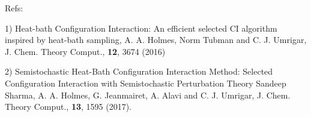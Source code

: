 \documentclass[12pt,aps,prb,groupedaddress,amsmath,amssymb]{revtex4-1}
\begin{document}
\vskip 9mm
Refs:
\small


1) Heat-bath Configuration Interaction: An efficient selected CI algorithm inspired by heat-bath sampling,
A. A. Holmes, Norm Tubman and C. J. Umrigar, J. Chem. Theory Comput., {\bf 12}, 3674 (2016)

2) Semistochastic Heat-Bath Configuration Interaction Method:
Selected Configuration Interaction with Semistochastic Perturbation Theory
Sandeep Sharma, A. A. Holmes, G. Jeanmairet, A. Alavi and C. J. Umrigar, J. Chem. Theory Comput., {\bf 13}, 1595 (2017).
\end{document}
